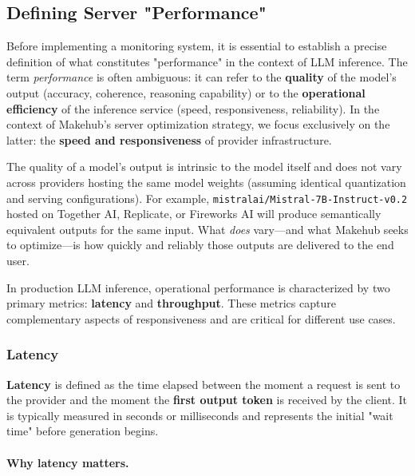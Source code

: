 \documentclass[english]{article}
\begin{document}
\subsection{Defining Server "Performance"}

Before implementing a monitoring system, it is essential to establish a precise definition of what constitutes "performance" in the context of LLM inference. The term \emph{performance} is often ambiguous: it can refer to the \textbf{quality} of the model's output (accuracy, coherence, reasoning capability) or to the \textbf{operational efficiency} of the inference service (speed, responsiveness, reliability). In the context of Makehub's server optimization strategy, we focus exclusively on the latter: the \textbf{speed and responsiveness} of provider infrastructure.

The quality of a model's output is intrinsic to the model itself and does not vary across providers hosting the same model weights (assuming identical quantization and serving configurations). For example, \texttt{mistralai/Mistral-7B-Instruct-v0.2} hosted on Together AI, Replicate, or Fireworks AI will produce semantically equivalent outputs for the same input. What \emph{does} vary—and what Makehub seeks to optimize—is how quickly and reliably those outputs are delivered to the end user.

In production LLM inference, operational performance is characterized by two primary metrics: \textbf{latency} and \textbf{throughput}. These metrics capture complementary aspects of responsiveness and are critical for different use cases.

\subsubsection{Latency}

\textbf{Latency} is defined as the time elapsed between the moment a request is sent to the provider and the moment the \textbf{first output token} is received by the client. It is typically measured in seconds or milliseconds and represents the initial "wait time" before generation begins.

\paragraph{Why latency matters.}
\end{document}
